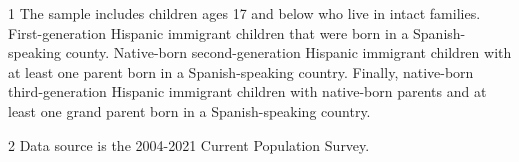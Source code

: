 \begin{table}[H]

\caption{Current Population Survey (CPS) Summary Statistics\label{tab:sumstat1}}
\centering
\begin{threeparttable}
\begin{tablenotes}
\item[1] The sample includes children ages 17 and below who live in intact families. First-generation Hispanic immigrant children that were born in a Spanish-speaking county. Native-born second-generation Hispanic immigrant children with at least one parent born in a Spanish-speaking country. Finally, native-born third-generation Hispanic immigrant children with native-born parents and at least one grand parent born in a Spanish-speaking country.
\item[2] Data source is the 2004-2021 Current Population Survey.
\end{tablenotes}
\end{threeparttable}
\end{table}
